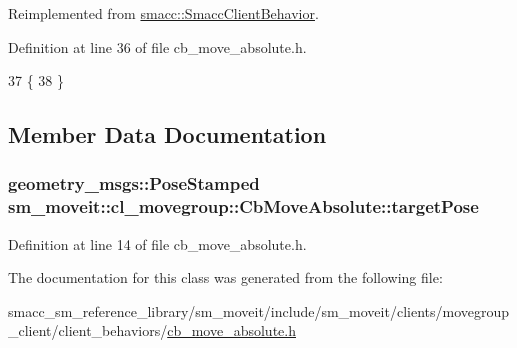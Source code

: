 Reimplemented from \hyperlink{classsmacc_1_1SmaccClientBehavior_ac0cd72d42bd00425362a97c9803ecce5}{smacc\+::\+Smacc\+Client\+Behavior}.



Definition at line 36 of file cb\+\_\+move\+\_\+absolute.\+h.


\begin{DoxyCode}
37   \{
38   \}
\end{DoxyCode}


\subsection{Member Data Documentation}
\subsubsection[{\texorpdfstring{target\+Pose}{targetPose}}]{\setlength{\rightskip}{0pt plus 5cm}geometry\+\_\+msgs\+::\+Pose\+Stamped sm\+\_\+moveit\+::cl\+\_\+movegroup\+::\+Cb\+Move\+Absolute\+::target\+Pose}\hypertarget{classsm__moveit_1_1cl__movegroup_1_1CbMoveAbsolute_aba451c75e2dfda0bc38fd043a8b24ab5}{}\label{classsm__moveit_1_1cl__movegroup_1_1CbMoveAbsolute_aba451c75e2dfda0bc38fd043a8b24ab5}


Definition at line 14 of file cb\+\_\+move\+\_\+absolute.\+h.



The documentation for this class was generated from the following file\+:\begin{DoxyCompactItemize}
\item 
smacc\+\_\+sm\+\_\+reference\+\_\+library/sm\+\_\+moveit/include/sm\+\_\+moveit/clients/movegroup\+\_\+client/client\+\_\+behaviors/\hyperlink{cb__move__absolute_8h}{cb\+\_\+move\+\_\+absolute.\+h}\end{DoxyCompactItemize}
